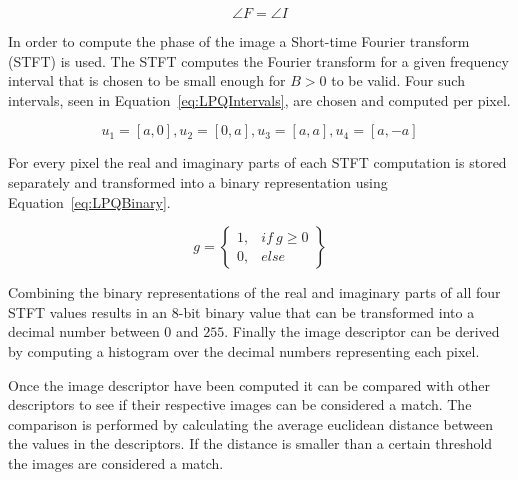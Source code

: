 \begin{equation}
  \angle F = \angle I
\label{eq:PSFFTFinal}
\end{equation}

In order to compute the phase of the image a Short-time Fourier transform (STFT) is used. The STFT computes the Fourier transform for a given frequency interval that is chosen to be small enough for \(B > 0\) to be valid. Four such intervals, seen in Equation~\ref{eq:LPQIntervals}, are chosen and computed per pixel.

\begin{equation}
  u_{1} = \left [ a, 0 \right ], u_{2} = \left [ 0, a \right ], u_{3} = \left [ a, a \right ], u_{4} = \left [ a, -a \right ]
\label{eq:LPQIntervals}
\end{equation}

For every pixel the real and imaginary parts of each STFT computation is stored separately and transformed into a binary representation using Equation~\ref{eq:LPQBinary}.

\begin{equation}
  g = \begin{Bmatrix}
   1, & if\ g \geq 0\\
   0, & else
  \end{Bmatrix}
\label{eq:LPQBinary}
\end{equation}

Combining the binary representations of the real and imaginary parts of all four STFT values results in an 8-bit binary value that can be transformed into a decimal number between \(0\) and \(255\). Finally the image descriptor can be derived by computing a histogram over the decimal numbers representing each pixel.

Once the image descriptor have been computed it can be compared with other descriptors to see if their respective images can be considered a match. The comparison is performed by calculating the average euclidean distance between the values in the descriptors. If the distance is smaller than a certain threshold the images are considered a match.
